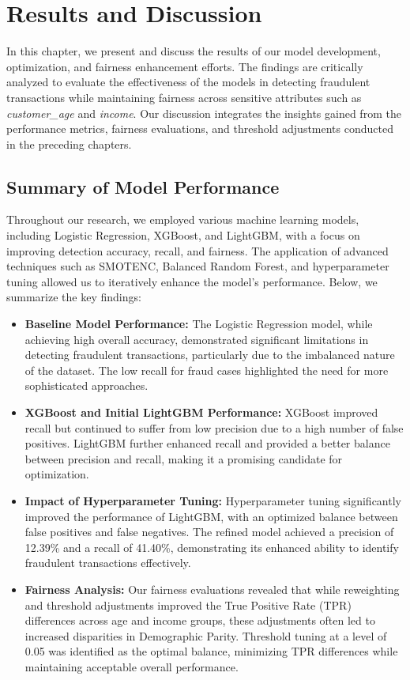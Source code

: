\documentclass[12pt,a4paper]{report}
\begin{document}
\chapter{Results and Discussion}

In this chapter, we present and discuss the results of our model development, optimization, and fairness enhancement efforts. The findings are critically analyzed to evaluate the effectiveness of the models in detecting fraudulent transactions while maintaining fairness across sensitive attributes such as \textit{customer\_age} and \textit{income}. Our discussion integrates the insights gained from the performance metrics, fairness evaluations, and threshold adjustments conducted in the preceding chapters.

\section{Summary of Model Performance}

Throughout our research, we employed various machine learning models, including Logistic Regression, XGBoost, and LightGBM, with a focus on improving detection accuracy, recall, and fairness. The application of advanced techniques such as SMOTENC, Balanced Random Forest, and hyperparameter tuning allowed us to iteratively enhance the model’s performance. Below, we summarize the key findings:

\begin{itemize}
    \item \textbf{Baseline Model Performance:} The Logistic Regression model, while achieving high overall accuracy, demonstrated significant limitations in detecting fraudulent transactions, particularly due to the imbalanced nature of the dataset. The low recall for fraud cases highlighted the need for more sophisticated approaches.
    
    \item \textbf{XGBoost and Initial LightGBM Performance:} XGBoost improved recall but continued to suffer from low precision due to a high number of false positives. LightGBM further enhanced recall and provided a better balance between precision and recall, making it a promising candidate for optimization.
    
    \item \textbf{Impact of Hyperparameter Tuning:} Hyperparameter tuning significantly improved the performance of LightGBM, with an optimized balance between false positives and false negatives. The refined model achieved a precision of 12.39\% and a recall of 41.40\%, demonstrating its enhanced ability to identify fraudulent transactions effectively.
    
    \item \textbf{Fairness Analysis:} Our fairness evaluations revealed that while reweighting and threshold adjustments improved the True Positive Rate (TPR) differences across age and income groups, these adjustments often led to increased disparities in Demographic Parity. Threshold tuning at a level of 0.05 was identified as the optimal balance, minimizing TPR differences while maintaining acceptable overall performance.
\end{itemize}
\end{document}
